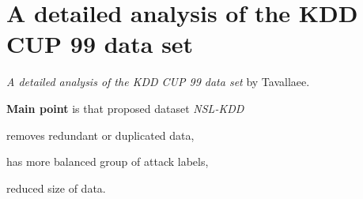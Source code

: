 \section{A detailed analysis of the KDD CUP 99 data set}
\label{ch:tavallaee2009}

\textit{A detailed analysis of the KDD CUP 99 data set} by Tavallaee.
\newline

\textbf{Main point} is that proposed dataset \textit{NSL-KDD} \begin{inparaenum}
\item removes redundant or duplicated data,
\item has more balanced group of attack labels,
\item reduced size of data.
\end{inparaenum}

